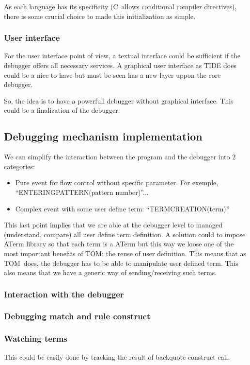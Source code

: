 \documentclass[a4paper]{article}
\newcommand{\TOM}{\textsf{TOM}}
\newcommand{\C}{\textsf{C}}
\begin{document}
As each language has its specificity (\C\ allows conditional compiler
directives), there is some crucial choice to made this initialization
as simple.


\subsubsection{User interface}
For the user interface point of view, a textual interface could be
sufficient if the debugger offers all necessary services. A graphical user
interface as TIDE does could be a nice to have but must be seen has a
new layer uppon the core debugger.

So, the idea is to have a powerfull debugger without graphical
interface. This could be a finalization of the debugger.

\subsection{Debugging mechanism implementation}
We can simplify the interaction between the program and the debugger
into 2 categories:
\begin{itemize}
\item Pure event for flow control without specific parameter. For
  exemple, ``ENTERINGPATTERN(pattern number)''...
\item Complex event with some user define term: ``TERMCREATION(term)''
\end{itemize}
This last point implies that we are able at the debugger level to
managed (understand, compare) all user define term definition. A
solution could to impose ATerm library so that each term is a ATerm
but this way we loose one of the most important benefits of \TOM: the
reuse of user definition. This means that as \TOM\ does, the debugger
has to be able to manipulate user defined term. This also means that
we have a generic way of sending/receiving such terms.
\subsubsection{Interaction with the debugger}
\subsubsection{Debugging match and rule construct}

\subsubsection{Watching terms}
This could be easily done by tracking the result of backquote construct call.
\end{document}
